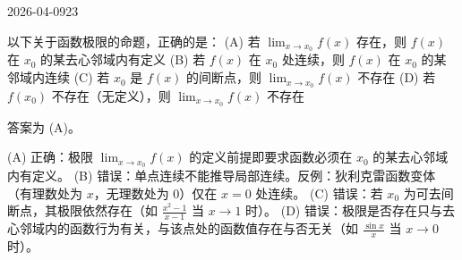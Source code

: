 \begin{mistake}{2026-04-09}{23}

\begin{problemcontent}
以下关于函数极限的命题，正确的是：
(A) 若 \( \lim_{x \to x_0} f(x) \) 存在，则 \( f(x) \) 在 \( x_0 \) 的某去心邻域内有定义
(B) 若 \( f(x) \) 在 \( x_0 \) 处连续，则 \( f(x) \) 在 \( x_0 \) 的某邻域内连续
(C) 若 \( x_0 \) 是 \( f(x) \) 的间断点，则 \( \lim_{x \to x_0} f(x) \) 不存在
(D) 若 \( f(x_0) \) 不存在（无定义），则 \( \lim_{x \to x_0} f(x) \) 不存在
\end{problemcontent}

\begin{solutioncontent}
答案为 (A)。

(A) 正确：极限 \( \lim_{x \to x_0} f(x) \) 的定义前提即要求函数必须在 \( x_0 \) 的某去心邻域内有定义。
(B) 错误：单点连续不能推导局部连续。反例：狄利克雷函数变体（有理数处为 \( x \)，无理数处为 \( 0 \)）仅在 \( x=0 \) 处连续。
(C) 错误：若 \( x_0 \) 为可去间断点，其极限依然存在（如 \( \frac{x^2-1}{x-1} \) 当 \( x \to 1 \) 时）。
(D) 错误：极限是否存在只与去心邻域内的函数行为有关，与该点处的函数值存在与否无关（如 \( \frac{\sin x}{x} \) 当 \( x \to 0 \) 时）。
\end{solutioncontent}


\end{mistake}
